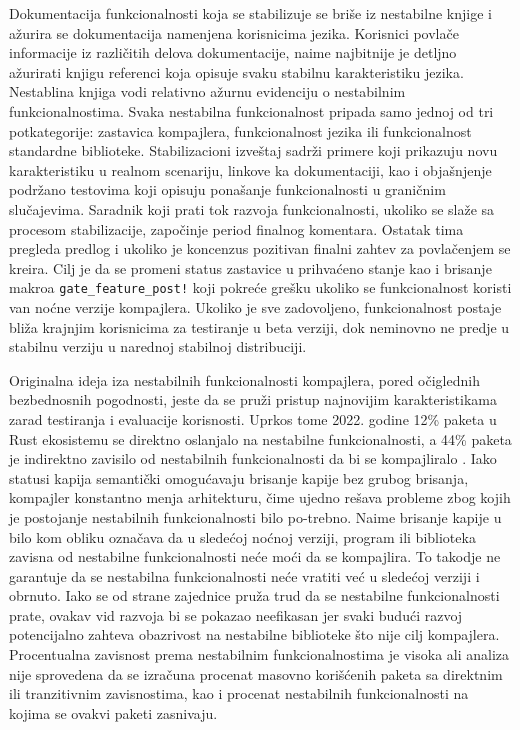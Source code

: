 Dokumentacija funkcionalnosti koja se stabilizuje se briše iz nestabilne knjige \cite{unstable} i ažurira se 
dokumentacija namenjena korisnicima jezika. Korisnici povlače informacije iz različitih delova dokumentacije,
naime najbitnije je detljno ažurirati knjigu referenci \cite{rust-reference} koja opisuje svaku stabilnu 
karakteristiku jezika. Nestablina knjiga vodi relativno ažurnu evidenciju o nestabilnim funkcionalnostima.
Svaka nestabilna funkcionalnost pripada samo jednoj od tri potkategorije: zastavica kompajlera, funkcionalnost jezika ili
funkcionalnost standardne biblioteke. Stabilizacioni izveštaj sadrži primere koji prikazuju novu karakteristiku 
u realnom scenariju, linkove ka dokumentaciji, kao i objašnjenje podržano testovima koji opisuju ponašanje funkcionalnosti u 
graničnim slučajevima. Saradnik koji prati tok razvoja funkcionalnosti, ukoliko se slaže sa procesom 
stabilizacije, započinje period finalnog komentara. Ostatak tima pregleda predlog i ukoliko je koncenzus
pozitivan finalni zahtev za povlačenjem se kreira. Cilj je da se promeni status zastavice u prihvaćeno
stanje kao i brisanje makroa \verb|gate_feature_post!| koji pokreće grešku ukoliko se funkcionalnost koristi van noćne verzije kompajlera.
Ukoliko je sve zadovoljeno, funkcionalnost postaje bliža krajnjim korisnicima za testiranje u beta verziji, dok
neminovno ne predje u stabilnu verziju u narednoj stabilnoj distribuciji. 

\newpage

Originalna ideja iza nestabilnih funkcionalnosti kompajlera, pored očiglednih bezbednosnih pogodnosti, 
jeste da se pruži pristup najnovijim karakteristikama zarad testiranja i evaluacije korisnosti.
Uprkos tome 2022. godine 12\%  paketa u Rust ekosistemu se direktno oslanjalo na nestabilne funkcionalnosti, a 
44\% paketa je indirektno zavisilo od nestabilnih funkcionalnosti da bi se kompajliralo \cite{unstable-flags}. Iako 
statusi kapija semantički omogućavaju brisanje kapije bez grubog brisanja, kompajler konstantno menja arhitekturu, čime ujedno 
rešava probleme zbog kojih je postojanje nestabilnih funkcionalnosti bilo po\hyp{}trebno. Naime brisanje kapije 
u bilo kom obliku označava da u sledećoj noćnoj verziji, program ili biblioteka zavisna od nestabilne funkcionalnosti
neće moći da se kompajlira. To takodje ne garantuje da se nestabilna funkcionalnosti neće vratiti već u sledećoj
verziji i obrnuto. Iako se od strane zajednice pruža trud da se nestabilne funkcionalnosti prate, ovakav vid 
razvoja bi se pokazao neefikasan jer svaki budući razvoj potencijalno zahteva obazrivost na nestabilne 
biblioteke što nije cilj kompajlera. Procentualna zavisnost prema nestabilnim funkcionalnostima je visoka ali 
analiza nije sprovedena da se izračuna procenat masovno korišćenih paketa sa direktnim ili tranzitivnim
zavisnostima, kao i procenat nestabilnih funkcionalnosti na kojima se ovakvi paketi zasnivaju.

